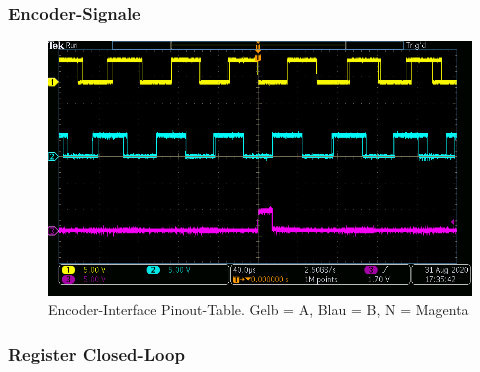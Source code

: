 

\subsubsection{Encoder-Signale}\label{Appendix:ABN_Signale}

\begin{figure}[H]
	\centering
	\includegraphics[width=\textwidth]{graphics/AMT322S-V_Signal}
	\caption{Encoder-Interface Pinout-Table. Gelb = A, Blau = B, N = Magenta}
	\label{fig:AMT322S-V_Signal}
\end{figure}



\subsubsection{Register Closed-Loop}\label{Appendix:ABN_Register}

